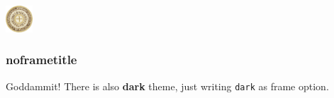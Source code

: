 \documentclass[aspectratio=169]{beamer}
\begin{document}




\begin{frame}[plain,dark,backgroundpicture=fig/scq_alameda,overlaytitlepage=0.9]
  \begin{minipage}[b][\textheight][b]{5cm}
    \includegraphics[height=1cm]{logos/alfonsoX_signum_reg}
  \end{minipage}
\end{frame}

\addtocounter{framenumber}{+1}
\begin{frame}[plain,dark,backgroundpicture=fig/scq_alameda,overlaytoc=0.9]
  \addtocounter{framenumber}{-1}
  \hspace*{7.3cm}\begin{minipage}{8cm}
    \tableofcontents
  \end{minipage}
\end{frame}





\begin{frame}
\frametitle{noframetitle}

\Large \centering Goddammit! There is also \textbf{dark} theme, just writing \texttt{dark}
as frame option.

\end{frame}
\end{document}
